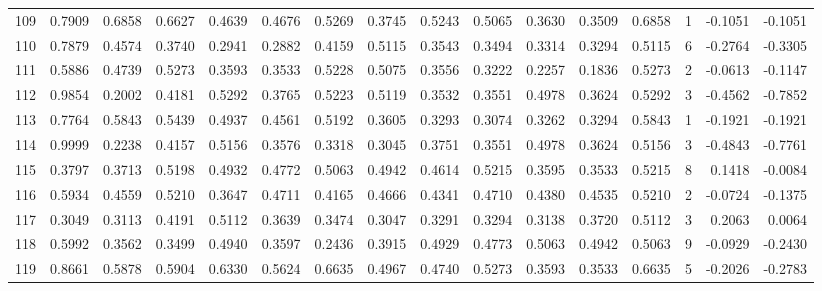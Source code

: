 \begin{tabular}{lrrrrrrrrrrrrrrr}
109 &      0.7909 &  0.6858 &  0.6627 &  0.4639 &  0.4676 &  0.5269 &  0.3745 &  0.5243 &  0.5065 &  0.3630 &   0.3509 &     0.6858 &      1 &                   -0.1051 &                    -0.1051 \\
110 &      0.7879 &  0.4574 &  0.3740 &  0.2941 &  0.2882 &  0.4159 &  0.5115 &  0.3543 &  0.3494 &  0.3314 &   0.3294 &     0.5115 &      6 &                   -0.2764 &                    -0.3305 \\
111 &      0.5886 &  0.4739 &  0.5273 &  0.3593 &  0.3533 &  0.5228 &  0.5075 &  0.3556 &  0.3222 &  0.2257 &   0.1836 &     0.5273 &      2 &                   -0.0613 &                    -0.1147 \\
112 &      0.9854 &  0.2002 &  0.4181 &  0.5292 &  0.3765 &  0.5223 &  0.5119 &  0.3532 &  0.3551 &  0.4978 &   0.3624 &     0.5292 &      3 &                   -0.4562 &                    -0.7852 \\
113 &      0.7764 &  0.5843 &  0.5439 &  0.4937 &  0.4561 &  0.5192 &  0.3605 &  0.3293 &  0.3074 &  0.3262 &   0.3294 &     0.5843 &      1 &                   -0.1921 &                    -0.1921 \\
114 &      0.9999 &  0.2238 &  0.4157 &  0.5156 &  0.3576 &  0.3318 &  0.3045 &  0.3751 &  0.3551 &  0.4978 &   0.3624 &     0.5156 &      3 &                   -0.4843 &                    -0.7761 \\
115 &      0.3797 &  0.3713 &  0.5198 &  0.4932 &  0.4772 &  0.5063 &  0.4942 &  0.4614 &  0.5215 &  0.3595 &   0.3533 &     0.5215 &      8 &                    0.1418 &                    -0.0084 \\
116 &      0.5934 &  0.4559 &  0.5210 &  0.3647 &  0.4711 &  0.4165 &  0.4666 &  0.4341 &  0.4710 &  0.4380 &   0.4535 &     0.5210 &      2 &                   -0.0724 &                    -0.1375 \\
117 &      0.3049 &  0.3113 &  0.4191 &  0.5112 &  0.3639 &  0.3474 &  0.3047 &  0.3291 &  0.3294 &  0.3138 &   0.3720 &     0.5112 &      3 &                    0.2063 &                     0.0064 \\
118 &      0.5992 &  0.3562 &  0.3499 &  0.4940 &  0.3597 &  0.2436 &  0.3915 &  0.4929 &  0.4773 &  0.5063 &   0.4942 &     0.5063 &      9 &                   -0.0929 &                    -0.2430 \\
119 &      0.8661 &  0.5878 &  0.5904 &  0.6330 &  0.5624 &  0.6635 &  0.4967 &  0.4740 &  0.5273 &  0.3593 &   0.3533 &     0.6635 &      5 &                   -0.2026 &                    -0.2783 \\

\end{tabular}
